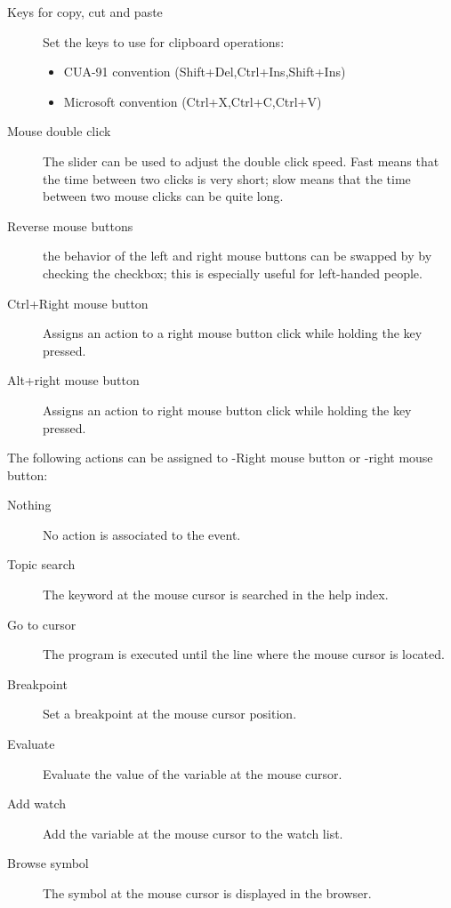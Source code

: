 \begin{description}
\item[Keys for copy, cut and paste] Set the keys to use for clipboard
operations:
\begin{itemize}
\item CUA-91 convention (Shift+Del,Ctrl+Ins,Shift+Ins)
\item Microsoft convention (Ctrl+X,Ctrl+C,Ctrl+V)
\end{itemize}
\item[Mouse double click]
The slider can be used to adjust the double click speed. Fast means that the
time between two clicks is very short; slow means that the time between two
mouse clicks can be quite long.
\item[Reverse mouse buttons]
the behavior of the left and right mouse buttons can be swapped by
by checking the checkbox; this is especially useful for left-handed people.
\item[Ctrl+Right mouse button]
Assigns an action to a right mouse button click while holding the
 key pressed.
\item[Alt+right mouse button]
Assigns an action to right mouse button click while holding the
 key pressed.
\end{description}

The following actions can be assigned to -Right mouse button or
-right mouse button:
\begin{description}
\item[Nothing] No action is associated to the event.
\item [Topic search] The keyword at the mouse cursor is searched in the
help index.
\item [Go to cursor] The program is executed until the line where
the mouse cursor is located.
\item [Breakpoint] Set a breakpoint at the mouse cursor position.
\item [Evaluate] Evaluate the value of the variable at the mouse
cursor.
\item [Add watch] Add the variable at the mouse cursor to the
watch list.
\item [Browse symbol] The symbol at the mouse cursor is displayed
in the browser.
\end{description}

